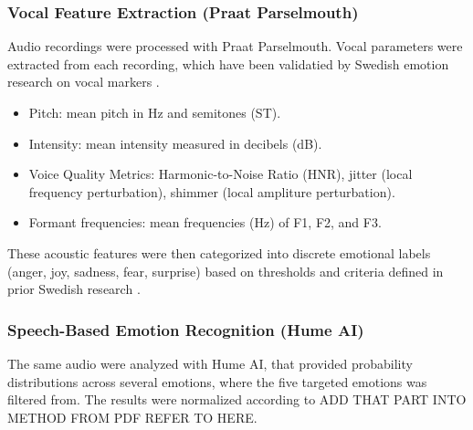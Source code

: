 \subsubsection{Vocal Feature Extraction (Praat Parselmouth)}
Audio recordings were processed with Praat Parselmouth. Vocal parameters were extracted from each recording, which have been validatied by Swedish emotion research on vocal markers \autocite{Ekberg2023}. 
\begin{itemize}
    \item Pitch: mean pitch in Hz and semitones (ST). 
    \item Intensity: mean intensity measured in decibels (dB). 
    \item Voice Quality Metrics: Harmonic-to-Noise Ratio (HNR), jitter (local frequency perturbation), shimmer (local ampliture perturbation). 
    \item Formant frequencies: mean frequencies (Hz) of F1, F2, and F3. 
\end{itemize}
These acoustic features were then categorized into discrete emotional labels (anger, joy, sadness, fear, surprise) based on thresholds and criteria defined in prior Swedish research \autocite{Ekberg2023}. 

\subsubsection{Speech-Based Emotion Recognition (Hume AI)}
The same audio were analyzed with Hume AI, that provided probability distributions across several emotions, where the five targeted emotions was filtered from. 
The results were normalized according to ADD THAT PART INTO METHOD FROM PDF REFER TO HERE. 

